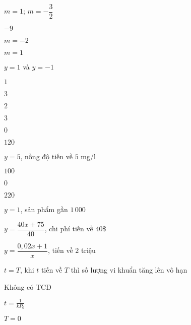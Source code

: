 \begin{Solution}{44}
$m=1$; $m=-\dfrac {3}{2}$
\end{Solution}
\begin{Solution}{45}
$-9$
\end{Solution}
\begin{Solution}{46}
$m=-2$
\end{Solution}
\begin{Solution}{47}
$m=1$
\end{Solution}
\begin{Solution}{48}
$y=1$ và $y=-1$
\end{Solution}
\begin{Solution}{49}
$1$
\end{Solution}
\begin{Solution}{50}
$3$
\end{Solution}
\begin{Solution}{51}
$2$
\end{Solution}
\begin{Solution}{52}
$3$
\end{Solution}
\begin{Solution}{53}
$0$
\end{Solution}
\begin{Solution}{54}
$120$
\end{Solution}
\begin{Solution}{55}
$y=5$, nồng độ tiến về $5$ mg/l
\end{Solution}
\begin{Solution}{56}
$100$
\end{Solution}
\begin{Solution}{57}
$0$
\end{Solution}
\begin{Solution}{58}
$220$
\end{Solution}
\begin{Solution}{59}
$y=1$, sản phẩm gần $1\,000$
\end{Solution}
\begin{Solution}{60}
$y=\dfrac {40x+75}{40}$, chi phí tiến về $40\$$
\end{Solution}
\begin{Solution}{61}
$y=\dfrac {0,02x+1}{x}$, tiến về $2$ triệu
\end{Solution}
\begin{Solution}{62}
$t=T$, khi $t$ tiến về $T$ thì số lượng vi khuẩn tăng lên vô hạn
\end{Solution}
\begin{Solution}{63}
Không có TCĐ
\end{Solution}
\begin{Solution}{64}
$t = \frac {1}{kP_0}$
\end{Solution}
\begin{Solution}{65}
$T=0$
\end{Solution}
